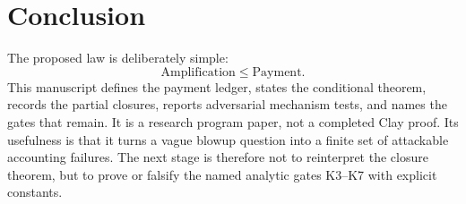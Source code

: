 \documentclass[11pt]{article}
\begin{document}
\clearpage
\section{Conclusion}
\label{sec:conclusion}

The proposed law is deliberately simple:
\[
\boxed{\mathrm{Amplification}\le\mathrm{Payment}.}
\]
This manuscript defines the payment ledger, states the conditional theorem,
records the partial closures, reports adversarial mechanism tests, and names
the gates that remain.  It is a research program paper, not a completed Clay
proof.  Its usefulness is that it turns a vague blowup question into a finite
set of attackable accounting failures.
The next stage is therefore not to reinterpret the closure theorem, but to
prove or falsify the named analytic gates K3--K7 with explicit constants.
\end{document}
